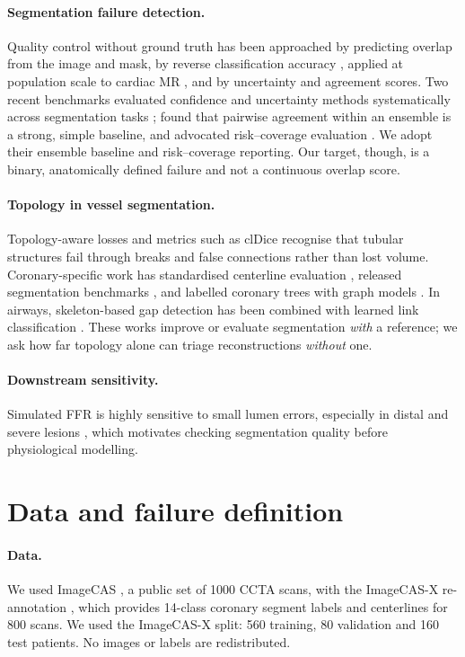 \documentclass[11pt]{article}
\begin{document}
\paragraph{Segmentation failure detection.} Quality control without ground truth has been approached by predicting overlap from the image and mask, by reverse classification accuracy \citep{valindria2017rca}, applied at population scale to cardiac MR \citep{robinson2019qc}, and by uncertainty and agreement scores. Two recent benchmarks evaluated confidence and uncertainty methods systematically across segmentation tasks \citep{kahl2024values,zenk2025failure}; \citet{zenk2025failure} found that pairwise agreement within an ensemble is a strong, simple baseline, and advocated risk--coverage evaluation \citep{geifman2017selective}. We adopt their ensemble baseline and risk--coverage reporting. Our target, though, is a binary, anatomically defined failure and not a continuous overlap score.

\paragraph{Topology in vessel segmentation.} Topology-aware losses and metrics such as clDice \citep{shit2021cldice} recognise that tubular structures fail through breaks and false connections rather than lost volume. Coronary-specific work has standardised centerline evaluation \citep{schaap2009rotterdam}, released segmentation benchmarks \citep{gharleghi2022asoca,zeng2023imagecas,bransby2026imagecasx}, and labelled coronary trees with graph models \citep{hampe2024gnn}. In airways, skeleton-based gap detection has been combined with learned link classification \citep{oyer2025repair}. These works improve or evaluate segmentation \emph{with} a reference; we ask how far topology alone can triage reconstructions \emph{without} one.

\paragraph{Downstream sensitivity.} Simulated FFR is highly sensitive to small lumen errors, especially in distal and severe lesions \citep{fernandez2024ffrct}, which motivates checking segmentation quality before physiological modelling.

\section{Data and failure definition}
\paragraph{Data.} We used ImageCAS \citep{zeng2023imagecas}, a public set of 1000 CCTA scans, with the ImageCAS-X re-annotation \citep{bransby2026imagecasx}, which provides 14-class coronary segment labels and centerlines for 800 scans. We used the ImageCAS-X split: 560 training, 80 validation and 160 test patients. No images or labels are redistributed.
\end{document}
